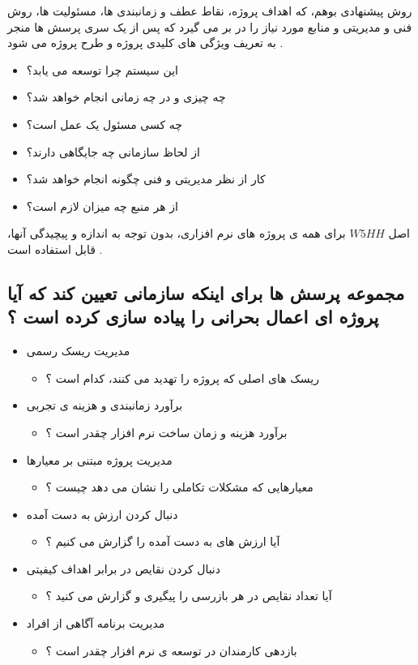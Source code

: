 \documentclass{article}
\begin{document}
روش پیشنهادی بوهم، که اهداف پروژه، نقاط عطف و زمانبندی ها، مسئولیت ها، روش فنی و مدیریتی و منابع مورد نیاز را در بر می گیرد که پس از یک سری پرسش ها منجر به تعریف ویژگی های کلیدی پروژه و طرح پروژه می شود .

\begin{itemize}
	\item این سیستم چرا توسعه می یابد؟
	\item چه چیزی و در چه زمانی انجام خواهد شد؟
	\item چه کسی مسئول یک عمل است؟
	\item از لحاظ سازمانی چه جایگاهی دارند؟
	\item کار از نظر مدیریتی و فنی چگونه انجام خواهد شد؟
	\item از هر منبع چه میزان لازم است؟
\end{itemize}


اصل $W5HH$ برای همه ی پروژه های نرم افزاری، بدون توجه به اندازه و پیچیدگی آنها، قابل استفاده است .


\subsection{مجموعه پرسش ها برای اینکه سازمانی تعیین کند که آیا پروژه ای اعمال بحرانی را پیاده سازی کرده است ؟}


\begin{itemize}
	\item مدیریت ریسک رسمی
	\begin{itemize}
		\item ریسک های اصلی که پروژه را تهدید می کنند، کدام است ؟
	\end{itemize}
	\item برآورد زمانبندی و هزینه ی تجربی
	\begin{itemize}
		\item برآورد هزینه و زمان ساخت نرم افزار چقدر است ؟
	\end{itemize}
	\item مدیریت پروژه مبتنی بر معیارها
	\begin{itemize}
		\item معیارهایی که مشکلات تکاملی را نشان می دهد چیست ؟
	\end{itemize}
	\item دنبال کردن ارزش به دست آمده
	\begin{itemize}
		\item آیا ارزش های به دست آمده را گزارش می کنیم ؟
	\end{itemize}
	\item دنبال کردن نقایص در برابر اهداف کیفیتی
	\begin{itemize}
		\item آیا تعداد نقایص در هر بازرسی را پیگیری و گزارش می کنید ؟
	\end{itemize}
	\item مدیریت برنامه آگاهی از افراد
	\begin{itemize}
		\item بازدهی کارمندان در توسعه ی نرم افزار چقدر است ؟
	\end{itemize}
\end{itemize}
\end{document}
